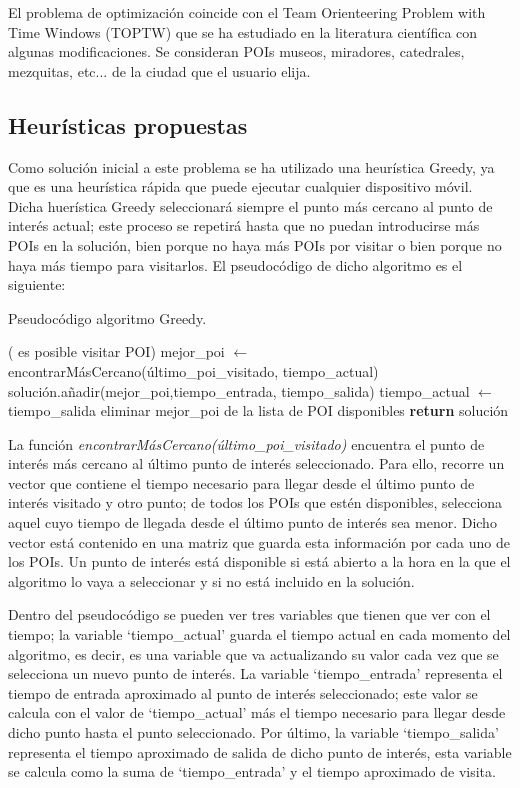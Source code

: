 El problema de optimización coincide con el Team Orienteering Problem with Time Windows (TOPTW) que se ha estudiado en la literatura científica con algunas modificaciones. Se consideran POIs museos, miradores, catedrales, mezquitas, etc... de la ciudad que el usuario elija.
\subsection[Heurísticas propuestas]{Heurísticas propuestas}
Como solución inicial a este problema se ha utilizado una heurística Greedy, ya que es una heurística rápida que puede ejecutar cualquier dispositivo móvil. Dicha huerística Greedy seleccionará siempre el punto más cercano al punto de interés actual; este proceso se repetirá hasta que no puedan introducirse más POIs en la solución, bien porque no haya más POIs por visitar o bien porque no haya más tiempo para visitarlos. El pseudocódigo de dicho algoritmo es el siguiente:\newline
\begin{algorithm}[H]
	\caption{Pseudocódigo algoritmo Greedy.}
	\label{alg:greedy_alg}
	\begin{algorithmic}
		\While( es posible visitar POI)
		\State mejor\_poi $\gets$ encontrarMásCercano(último\_poi\_visitado, tiempo\_actual) 
		\State solución.añadir(mejor\_poi,tiempo\_entrada, tiempo\_salida)
		\State tiempo\_actual $\gets$ tiempo\_salida
		\State eliminar mejor\_poi de la lista de POI disponibles
		\EndWhile
		\State \textbf{return} solución
		\EndFunction
	\end{algorithmic}
\end{algorithm}
\vspace{0.06in}
La función \textit{encontrarMásCercano(último\_poi\_visitado)} encuentra el punto de interés más cercano al último punto de interés seleccionado. Para ello, recorre un vector que contiene el tiempo necesario para llegar desde el último punto de interés visitado y otro punto; de todos los POIs que estén disponibles, selecciona aquel cuyo tiempo de llegada desde el último punto de interés sea menor. Dicho vector está contenido en una matriz que guarda esta información por cada uno de los POIs. Un punto de interés está disponible si está abierto a la hora en la que el algoritmo lo vaya a seleccionar y si no está incluido en la solución.\newline

Dentro del pseudocódigo se pueden ver tres variables que tienen que ver con el tiempo; la variable \enquote*{tiempo\_actual} guarda el tiempo actual en cada momento del algoritmo, es decir, es una variable que va actualizando su valor cada vez que se selecciona un nuevo punto de interés. La variable \enquote*{tiempo\_entrada} representa el tiempo de entrada aproximado al punto de interés seleccionado; este valor se calcula con el valor de \enquote*{tiempo\_actual} más el tiempo necesario para llegar desde dicho punto hasta el punto seleccionado. Por último, la variable \enquote*{tiempo\_salida} representa el tiempo aproximado de salida de dicho punto de interés, esta variable se calcula como la suma de \enquote*{tiempo\_entrada} y el tiempo aproximado de visita.\newline

